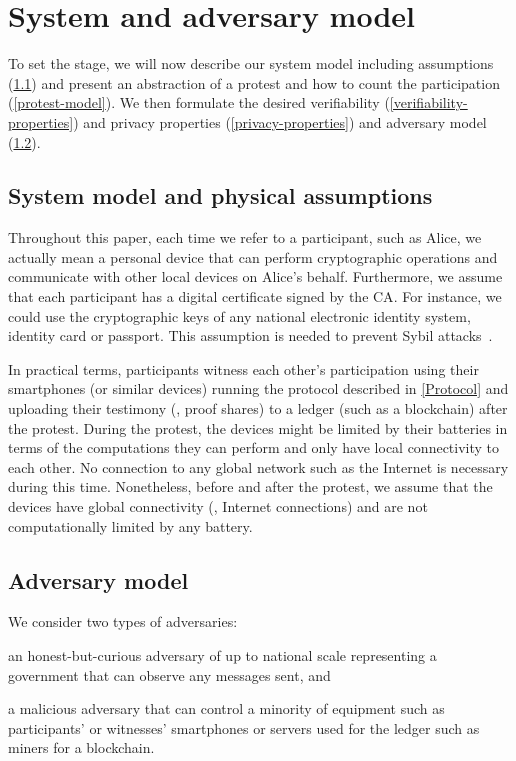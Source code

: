 \section{System and adversary model}%
\label{system-model}

To set the stage, we will now describe our system model including assumptions
(\cref{assumptions}) and present an abstraction of a protest and how to
count the participation (\cref{protest-model}). We then formulate the desired verifiability
(\cref{verifiability-properties}) and privacy properties
(\cref{privacy-properties}) and adversary model (\cref{adversary-model}).


\subsection{System model and physical assumptions}
\label{assumptions}

Throughout this paper, each time we refer to a participant, such as Alice, we actually mean a personal device that can perform cryptographic operations and communicate with other local devices on Alice's behalf. 
Furthermore, we assume that each participant has a digital certificate signed by the \ac{CA}.
For instance, we could use the cryptographic keys of any national electronic identity system, identity card or passport.
This assumption is needed to prevent Sybil attacks~\cite{SybilAttack}.

In practical terms, participants witness each other's participation
using their smartphones (or similar devices) running the protocol
described in \cref{Protocol} and uploading their testimony (\ie, proof
shares) to a ledger (such as a blockchain) after the protest. 
During the protest, the devices might be limited by their batteries in
terms of the computations they can perform and only have local connectivity to each other.
No connection to any global network such as the Internet is
necessary during this time.  
Nonetheless, before and after the protest, we assume that the devices have global connectivity (\ie, Internet connections) and are not computationally limited by any battery.





\subsection{Adversary model}
\label{adversary-model}

We consider two types of adversaries: \begin{enumerate*} \item an honest-but-curious adversary
of up to national scale representing a government that can observe any
messages sent, and \item a malicious adversary that can control a
minority of 
equipment such as participants' or witnesses' smartphones or servers
used for the ledger such as miners for a blockchain. \end{enumerate*}
